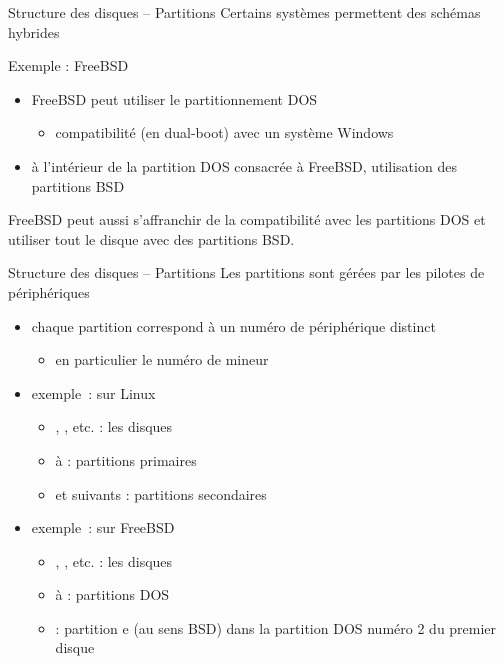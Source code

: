 \begin {frame} {Structure des disques -- Partitions}
    Certains systèmes permettent des schémas hybrides

    \vspace* {3mm}

    Exemple : FreeBSD

    \begin {itemize}
	\item FreeBSD peut utiliser le partitionnement DOS
	    \begin {itemize}
		\item compatibilité (en dual-boot) avec un système Windows
	    \end {itemize}
	\item à l'intérieur de la partition DOS consacrée à FreeBSD,
	    utilisation des partitions BSD
    \end {itemize}

    FreeBSD peut aussi s'affranchir de la compatibilité avec les
    partitions DOS et utiliser tout le disque avec des partitions BSD.
\end {frame}

\begin {frame} {Structure des disques -- Partitions}
    Les partitions sont gérées par les pilotes de périphériques

    \begin {itemize}
	\item chaque partition correspond à un numéro de périphérique
	    distinct

	    \begin {itemize}
		\item en particulier le numéro de mineur
	    \end {itemize}

	\item exemple~: sur Linux

	    \begin {itemize}
		\item {}, , etc. : les disques
		\item {} à  : partitions
		    primaires
		\item {} et suivants : partitions
		    secondaires

	    \end {itemize}

	\item exemple~: sur FreeBSD

	    \begin {itemize}
		\item {}, , etc. : les disques
		\item {} à  : partitions
		    DOS
		\item {} : partition e (au sens BSD) dans
		    la partition DOS numéro 2 du premier disque

	    \end {itemize}
    \end {itemize}
\end {frame}

